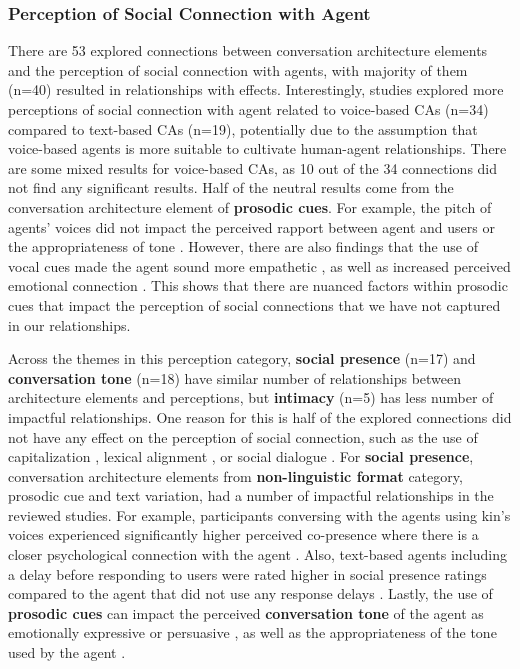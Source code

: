 \documentclass[sigconf,screen,review, anonymous]{acmart}
\newcommand{\cmt}[1]{}%
\begin{document}
\subsubsection{Perception of Social Connection with Agent}

There are 53 explored connections between conversation architecture elements and the perception of social connection with agents, with majority of them (n=40) resulted in relationships with effects. Interestingly, studies explored more perceptions of social connection with agent related to voice-based CAs (n=34) compared to text-based CAs (n=19), potentially due to the assumption that voice-based agents is more suitable to cultivate human-agent relationships. There are some mixed results for voice-based CAs, as 10 out of the 34 connections did not find any significant results. Half of the neutral results come from the conversation architecture element of \textbf{prosodic cues}. For example, the pitch of agents' voices did not impact the perceived rapport \cite{lubold2016effects}\cmt{[86]} between agent and users or the appropriateness of tone \cite{jestin2022effects}\cmt{[81]}. However, there are also findings that the use of vocal cues made the agent sound more empathetic \cite{tolmeijer2021female}\cmt{[62]}, as well as increased perceived emotional connection \cite{chan2021kinvoices}\cmt{[74]}\cite{kim2020can}\cmt{[24]}. This shows that there are nuanced factors within prosodic cues that impact the perception of social connections that we have not captured in our relationships.

Across the themes in this perception category, \textbf{social presence} (n=17) and \textbf{conversation tone} (n=18) have similar number of relationships between architecture elements and perceptions, but \textbf{intimacy} (n=5) has less number of impactful relationships. One reason for this is half of the explored connections did not have any effect on the perception of social connection, such as the use of capitalization \cite{westerman2019believe}\cmt{[9]}, lexical alignment \cite{linnemann2018can}\cmt{[15]}, or social dialogue \cite{lubold2016effects}\cmt{[86]}. For \textbf{social presence}, conversation architecture elements from \textbf{non-linguistic format} category, prosodic cue and text variation, had a number of impactful relationships in the reviewed studies. For example, participants conversing with the agents using kin's voices experienced significantly higher perceived co-presence where there is a closer psychological connection with the agent \cite{chan2021kinvoices}\cmt{[74]}. Also, text-based agents including a delay before responding to users were rated higher in social presence ratings compared to the agent that did not use any response delays \cite{gnewuch2018faster}\cmt{[19]}\cite{gnewuch2022opposing}\cmt{[20]}. Lastly, the use of \textbf{prosodic cues} can impact the perceived \textbf{conversation tone} of the agent as emotionally expressive \cite{zhu2022effects}\cmt{[26]} or persuasive \cite{chan2021kinvoices}\cmt{[74]}, as well as the appropriateness of the tone used by the agent \cite{jestin2022effects}\cmt{[81]}\cite{misu2011toward}\cmt{[83]}.
\end{document}
